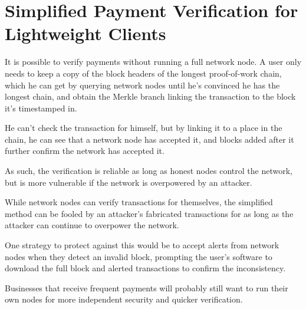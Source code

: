 \section{Simplified Payment Verification for Lightweight Clients}

It is possible to verify payments without running a full network node. A user only needs to keep a copy of the block headers of the longest proof-of-work chain, which he can get by querying network nodes until he's convinced he has the longest chain, and obtain the Merkle branch linking the transaction to the block it's timestamped in.

He can't check the transaction for himself, but by linking it to a place in the chain, he can see that a network node has accepted it, and blocks added after it further confirm the network has accepted it.

As such, the verification is reliable as long as honest nodes control the network, but is more vulnerable if the network is overpowered by an attacker.

While network nodes can verify transactions for themselves, the simplified method can be fooled by an attacker's fabricated transactions for as long as the attacker can continue to overpower the network.

One strategy to protect against this would be to accept alerts from network nodes when they detect an invalid block, prompting the user's software to download the full block and alerted transactions to confirm the inconsistency.

Businesses that receive frequent payments will probably still want to run their own nodes for more independent security and quicker verification.